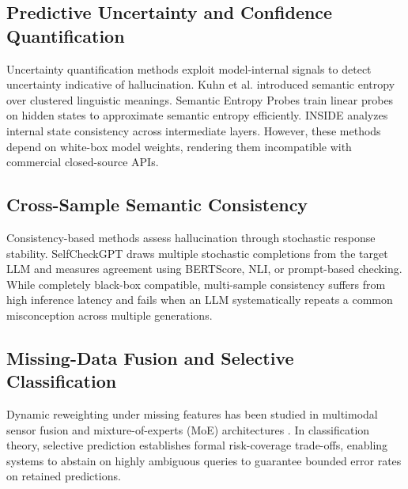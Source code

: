 \documentclass[conference]{IEEEtran}
\begin{document}
\subsection{Predictive Uncertainty and Confidence Quantification}
Uncertainty quantification methods exploit model-internal signals to detect uncertainty indicative of hallucination. Kuhn et al. \cite{kuhn2023semantic} introduced semantic entropy over clustered linguistic meanings. Semantic Entropy Probes \cite{kossen2024semantic} train linear probes on hidden states to approximate semantic entropy efficiently. INSIDE \cite{chen2024inside} analyzes internal state consistency across intermediate layers. However, these methods depend on white-box model weights, rendering them incompatible with commercial closed-source APIs.

\subsection{Cross-Sample Semantic Consistency}
Consistency-based methods assess hallucination through stochastic response stability. SelfCheckGPT \cite{manakul2023selfcheckgpt} draws multiple stochastic completions from the target LLM and measures agreement using BERTScore, NLI, or prompt-based checking. While completely black-box compatible, multi-sample consistency suffers from high inference latency and fails when an LLM systematically repeats a common misconception across multiple generations.

\subsection{Missing-Data Fusion and Selective Classification}
Dynamic reweighting under missing features has been studied in multimodal sensor fusion \cite{baltrusaitis2018multimodal} and mixture-of-experts (MoE) architectures \cite{shazeer2017outrageously, lakshminarayanan2017simple}. In classification theory, selective prediction \cite{geifman2017selective} establishes formal risk-coverage trade-offs, enabling systems to abstain on highly ambiguous queries to guarantee bounded error rates on retained predictions.
\end{document}
